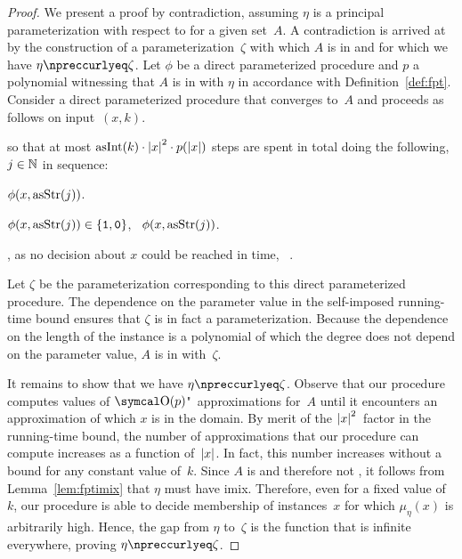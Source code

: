 \begin{proof}
  We present a proof by contradiction, assuming $\eta$ is a principal parameterization with respect to  for a given  set~$A$.
  A contradiction is arrived at by the construction of a parameterization~$\zeta$ with which $A$ is in  and for which we have $\eta \notquasile \zeta$.
  Let $\phi$ be a direct parameterized procedure and $p$ a polynomial witnessing that $A$ is in  with $\eta$ in accordance with Definition~\ref{def:fpt}.
  Consider a direct parameterized procedure that converges to~$A$ and proceeds as follows on input~$(x, k)$.
  \begin{codelisting}
  \item
     so that at most $\asNat(k) \cdot \length{x}^2 \cdot p(\length{x})$ steps are spent in total doing the following,  $j \in \bbN$ in sequence:
    \begin{codelisting}
    \item
       $\phi(x, \asStr(j))$.
    \item
       $\phi(x, \asStr(j)) \in \{\bits{1}, \bits{0}\}$, ~$\phi(x, \asStr(j))$.
    \end{codelisting}
  \item
    , as no decision about $x$ could be reached in time, ~.
  \end{codelisting}

  Let $\zeta$ be the parameterization corresponding to this direct parameterized procedure.
  The dependence on the parameter value in the self-imposed running-time bound ensures that $\zeta$ is in fact a parameterization.
  Because the dependence on the length of the instance is a polynomial of which the degree does not depend on the parameter value, $A$ is in  with~$\zeta$.

  It remains to show that we have $\eta \notquasile \zeta$.
  Observe that our procedure computes values of $\bigO(p)$"~approximations for~$A$ until it encounters an approximation of which $x$ is in the domain.
  By merit of the ${\lvert x\rvert}^2$~factor in the running-time bound, the number of approximations that our procedure can compute increases as a function of~${\lvert x\rvert}$.
  In fact, this number increases without a bound for any constant value of~$k$.
  Since $A$ is  and therefore not , it follows from Lemma~\ref{lem:fptimix} that $\eta$ must have imix.
  Therefore, even for a fixed value of~$k$, our procedure is able to decide membership of instances~$x$ for which $\mu_\eta(x)$ is arbitrarily high.
  Hence, the gap from $\eta$ to~$\zeta$ is the function that is infinite everywhere, proving $\eta \notquasile \zeta$.
\end{proof}
%

